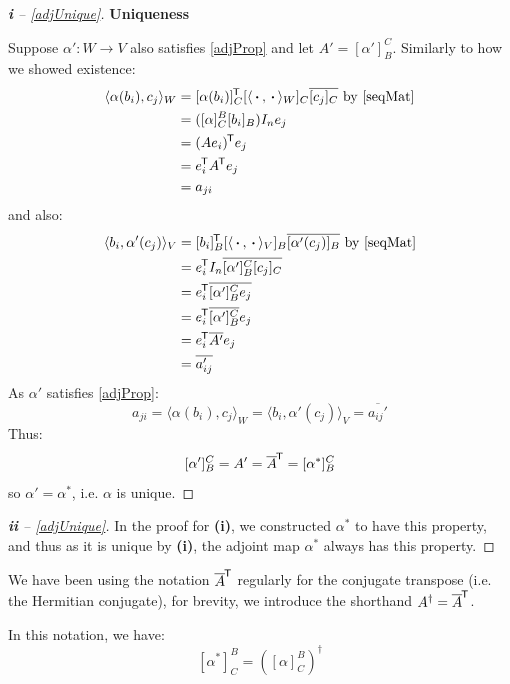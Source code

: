 \documentclass[../main.tex]{subfiles}
\begin{document}
\begin{proof}[\textbf{i} -- \cref{adjUnique}]
  \textbf{Uniqueness}\par
  Suppose $\alpha': W \to V$ also satisfies \cref{adjProp} and let $A' = [\alpha']^{C}_{B}$.
  Similarly to how we showed existence:
  \begin{align*}
    \langle \alpha(b_i), c_j \rangle_W &= [\alpha(b_i)]^{\trans}_C [\langle \argdot, \argdot \rangle_W]_C \overline{[c_j]_C} \text{ by \cref{seqMat}} \\
                                       &= ([\alpha]^{B}_{C}[b_i]_B) I_n e_j \\
                                       &= (Ae_i)^{\trans} e_j \\
                                       &= e^{\trans}_i A^{\trans} e_j \\
                                       &= a_{j i}
  \end{align*}
  and also:
  \begin{align*}
    \langle b_i, \alpha'(c_j) \rangle_V &= [b_i]^{\trans}_B [\langle \argdot, \argdot \rangle_V]_B \overline{[\alpha'(c_j)]_B} \text{ by \cref{seqMat}} \\
                                      &= e^{\trans}_i I_n \overline{[\alpha']^{C}_{B}[c_j]_C} \\
                                      &= e^{\trans}_i \overline{[\alpha']^{C}_{B} e_j} \\
                                      &= e^{\trans}_i \overline{[\alpha']^{C}_{B}} e_j \\
                                      &= e^{\trans}_i \overline{A'} e_j \\
                                      &= \overline{a_{i j}'} \\
  \end{align*}
  As $\alpha'$ satisfies \cref{adjProp}:
  \[
    a_{j i} = \langle \alpha(b_i), c_j \rangle_W = \langle b_i, \alpha'(c_j) \rangle_V = \overline{a_{i j}'}
  \]
  Thus:
  \[
    [\alpha']^{C}_{B} = A' = \overline{A}^{{\mkern-1.5mu\mathsf{T}}} = [\alpha^{*}]^{C}_{B}
  \]
  so $\alpha' = \alpha^{*}$, i.e. $\alpha$ is unique.
\end{proof}
\begin{proof}[\textbf{ii} -- \cref{adjUnique}]
  In the proof for \textbf{(i)}, we constructed $\alpha^{*}$ to have this property, and thus as it is unique by \textbf{(i)}, the adjoint map $\alpha^{*}$ always has this property.
\end{proof}
\begin{remark}[Notation]
  We have been using the notation $\overline{A}^{{\mkern-1.5mu\mathsf{T}}}$ regularly for the conjugate transpose (i.e. the Hermitian conjugate), for brevity, we introduce the shorthand $A^{\dag} = \overline{A}^{{\mkern-1.5mu\mathsf{T}}}$.

  In this notation, we have:
  \[
    [\alpha^{*}]^{B}_{C} = ([\alpha]^{B}_{C})^{\dag}
  \]
\end{remark}
\end{document}
